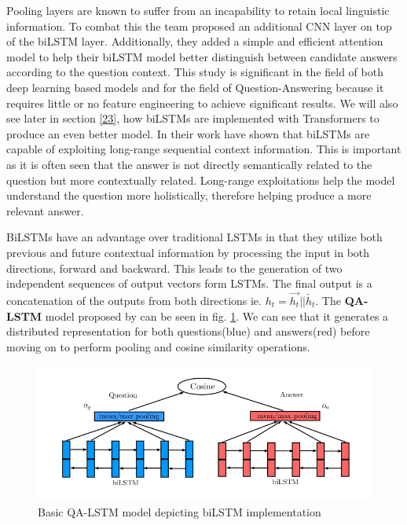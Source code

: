 \documentclass[12pt]{report}
\begin{document}
            Pooling layers are known to suffer from an incapability to retain local linguistic information. To combat this the team proposed an additional CNN layer on top of the biLSTM layer. Additionally, they added a simple and efficient attention model to help their biLSTM model better distinguish between candidate answers according to the question context. This study is significant in the field of both deep learning based models and for the field of Question-Answering because it requires little or no feature engineering to achieve significant results. We will also see later in section \ref{23}, how biLSTMs are implemented with Transformers to produce an even better model.
            In their work \citep{lstmhaighextractive} have shown that biLSTMs are capable of exploiting long-range sequential context information. This is important as it is often seen that the answer is not directly semantically related to the question but more contextually related. Long-range exploitations help the model understand the question more holistically, therefore helping produce a more relevant answer.

            BiLSTMs have an advantage over traditional LSTMs in that they utilize both previous and future contextual information by processing the input in both directions, forward and backward. This leads to the generation of two independent sequences of output vectors form LSTMs. The final output is a concatenation  of the outputs from both directions ie. $h_t= \overrightarrow{h_t} || \overleftarrow{h_t} $.
            The \textbf{QA-LSTM} model  proposed by \citep{lstmhaighextractive} can be seen in fig. \ref{lstmhaig}. We can see that it generates a distributed representation for both questions(blue) and answers(red) before moving on to perform pooling and cosine similarity operations.
	        \begin{figure}
                \centering
                \includegraphics[scale=0.4]{../images/lstm-bilstmhaig.png}
                \caption{Basic QA-LSTM model depicting biLSTM implementation \cite{lstmhaighextractive}}\label{lstmhaig}
            \end{figure}
\end{document}
